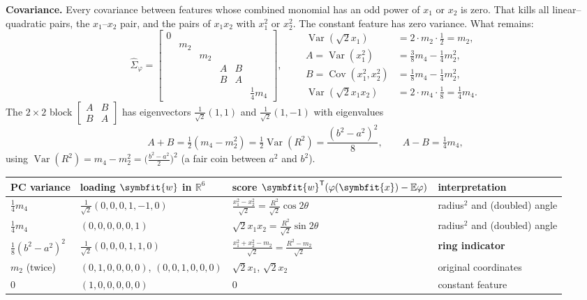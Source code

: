 \documentclass[11pt]{article}
\newcommand{\bm}[1]{\symbfit{#1}}
\newcommand{\R}{\mathbb{R}}
\newcommand{\vx}{\bm{x}}
\newcommand{\vw}{\bm{w}}
\newcommand{\Sig}{\widehat{\Sigma}}
\newcommand{\T}{^{\mathsf T}}
\begin{document}
\textbf{Covariance.} Every covariance between features whose combined monomial has an odd power of
$x_1$ or $x_2$ is zero. That kills all linear--quadratic pairs, the $x_1$--$x_2$ pair, and the pairs of
$x_1x_2$ with $x_1^2$ or $x_2^2$. The constant feature has zero variance. What remains:
\[
\Sig_\varphi=\begin{bmatrix}
0&&&&&\\
&m_2&&&&\\
&&m_2&&&\\
&&&A&B&\\
&&&B&A&\\
&&&&&\tfrac14m_4
\end{bmatrix},\qquad
\begin{aligned}
\operatorname{Var}(\sqrt2x_1)&=2\cdot m_2\cdot\tfrac12=m_2,\\
A=\operatorname{Var}(x_1^2)&=\tfrac38m_4-\tfrac14m_2^2,\\
B=\operatorname{Cov}(x_1^2,x_2^2)&=\tfrac18m_4-\tfrac14m_2^2,\\
\operatorname{Var}(\sqrt2x_1x_2)&=2\cdot m_4\cdot\tfrac18=\tfrac14m_4 .
\end{aligned}
\]
The $2\times2$ block $\begin{bmatrix}A&B\\B&A\end{bmatrix}$ has eigenvectors $\tfrac1{\sqrt2}(1,1)$ and
$\tfrac1{\sqrt2}(1,-1)$ with eigenvalues
\[
A+B=\tfrac12(m_4-m_2^2)=\tfrac12\operatorname{Var}(R^2)=\frac{(b^2-a^2)^2}{8},\qquad A-B=\tfrac14m_4,
\]
using $\operatorname{Var}(R^2)=m_4-m_2^2=\big(\tfrac{b^2-a^2}{2}\big)^2$ (a fair coin between $a^2$ and $b^2$).

\begin{center}
\renewcommand{\arraystretch}{1.45}
\small
\begin{tabular}{p{2.6cm}p{3.6cm}p{4.1cm}p{3.6cm}}
\toprule
PC variance & loading $\vw$ in $\R^6$ & score $\vw\T(\varphi(\vx)-\mathbb E\varphi)$ & interpretation\\
\midrule
$\tfrac14m_4$ & $\tfrac1{\sqrt2}(0,0,0,1,-1,0)$ & $\tfrac{x_1^2-x_2^2}{\sqrt2}=\tfrac{R^2}{\sqrt2}\cos2\theta$ & radius$^2$ and (doubled) angle \\
$\tfrac14m_4$ & $(0,0,0,0,0,1)$ & $\sqrt2x_1x_2=\tfrac{R^2}{\sqrt2}\sin2\theta$ & radius$^2$ and (doubled) angle \\
$\tfrac18(b^2-a^2)^2$ & $\tfrac1{\sqrt2}(0,0,0,1,1,0)$ & $\tfrac{x_1^2+x_2^2-m_2}{\sqrt2}=\tfrac{R^2-m_2}{\sqrt2}$ & \textbf{ring indicator} \\
$m_2$ (twice) & $(0,1,0,0,0,0)$, $(0,0,1,0,0,0)$ & $\sqrt2x_1$, $\sqrt2x_2$ & original coordinates \\
$0$ & $(1,0,0,0,0,0)$ & $0$ & constant feature \\
\bottomrule
\end{tabular}
\end{center}
\end{document}

